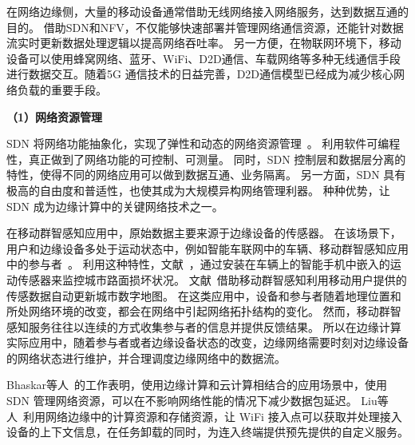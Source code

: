 在网络边缘侧，大量的移动设备通常借助无线网络接入网络服务，达到数据互通的目的。
借助SDN和NFV，不仅能够快速部署并管理网络通信资源，还能针对数据流实时更新数据处理逻辑以提高网络吞吐率。
另一方便，在物联网环境下，移动设备可以使用蜂窝网络、蓝牙、WiFi、D2D通信、车载网络等多种无线通信手段进行数据交互。随着5G 通信技术的日益完善，D2D通信模型已经成为减少核心网络负载的重要手段。

\textbf{（1）网络资源管理}

SDN 将网络功能抽象化，实现了弹性和动态的网络资源管理~\cite{DBLP:journals/jzusc/WangWYG18}。
利用软件可编程性，真正做到了网络功能的可控制、可测量。
同时，SDN 控制层和数据层分离的特性，使得不同的网络应用可以做到数据互通、业务隔离。
另一方面，SDN 具有极高的自由度和普适性，也使其成为大规模异构网络管理利器。
种种优势，让 SDN 成为边缘计算中的关键网络技术之一。


在移动群智感知应用中，原始数据主要来源于边缘设备的传感器。
在该场景下，用户和边缘设备多处于运动状态中，例如智能车联网中的车辆、移动群智感知应用中的参与者~\cite{DBLP:journals/jsac/LyuNTLWGP17}。
利用这种特性，文献~，通过安装在车辆上的智能手机中嵌入的运动传感器来监控城市路面损坏状况。
文献~借助移动群智感知利用移动用户提供的传感数据自动更新城市数字地图。
在这类应用中，设备和参与者随着地理位置和所处网络环境的改变，都会在网络中引起网络拓扑结构的变化。
然而，移动群智感知服务往往以连续的方式收集参与者的信息并提供反馈结果。
所以在边缘计算实际应用中，随着参与者或者边缘设备状态的改变，边缘网络需要时刻对边缘设备的网络状态进行维护，并合理调度边缘网络中的数据流。

Bhaskar等人~\cite{DBLP:conf/infocom/RimalVM16}的工作表明，使用边缘计算和云计算相结合的应用场景中，使用 SDN 管理网络资源，可以在不影响网络性能的情况下减少数据包延迟。
Liu等人~\cite{DBLP:conf/edge/LiuWB16}利用网络边缘中的计算资源和存储资源，让 WiFi 接入点可以获取并处理接入设备的上下文信息，在任务卸载的同时，为连入终端提供预先提供的自定义服务。



